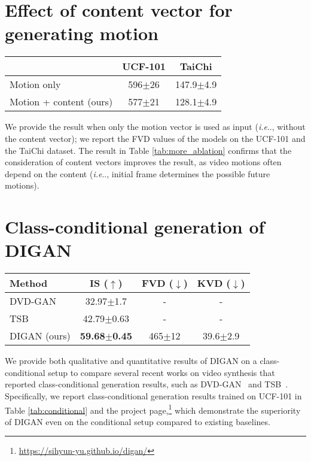\documentclass{article} \usepackage{iclr2022_conference,times}
\makeatletter
\DeclareRobustCommand\onedot{\futurelet\@let@token\@onedot}
\def\@onedot{\ifx\@let@token.\else.\null\fi\xspace}
\def\ie{\emph{i.e}\onedot} \def\Ie{\emph{I.e}\onedot}
\newcommand{\stdv}[1]{\scriptsize$\pm$#1}
\makeatother
\begin{document}
 \section{Effect of content vector for generating motion}

\begin{table*}[h]
\centering
\caption{
Effect of the motion vector $z_I$ for generating the motion. We report the mean and standard deviation of the FVD values over 10 runs.
}
\vspace{-0.1in}
\begin{tabular}{lcc}
\toprule
 & UCF-101 & TaiChi \\
\midrule
Motion only & 596\stdv{26} & 147.9\stdv{4.9}  \\
Motion + content (ours) &  577\stdv{21} & 128.1\stdv{4.9} \\
\bottomrule
\end{tabular}
\label{tab:more_ablation}
\end{table*}

We provide the result when only the motion vector is used as input (\ie, without the content vector); we report the FVD values of the models on the UCF-101 and the TaiChi dataset. The result in Table \ref{tab:more_ablation} confirms that the consideration of content vectors improves the result, as video motions often depend on the content (\ie, initial frame determines the possible future motions).
 
\clearpage
\section{Class-conditional generation of DIGAN}

\begin{table*}[h]
\centering
\caption{
IS, FVD, and KVD values of video generation models on the UCF-101 dataset. $\uparrow$ and $\downarrow$ imply higher and lower values are better, respectively.
Subscripts denote standard deviations, and bolds indicate the best results.
}
\vspace{-0.1in}
\begin{tabular}{lccc}
\toprule
Method       & IS ($\uparrow$)  & FVD ($\downarrow$) & KVD ($\downarrow$) \\
\midrule
DVD-GAN      & 32.97\stdv{1.7\phantom{0}}  & -                  & - \\
TSB          & 42.79\stdv{0.63} & -                  & - \\
DIGAN (ours) & \textbf{59.68\stdv{0.45}}  & 465\stdv{12} &  39.6\stdv{2.9}  \\
\bottomrule
\end{tabular}
\label{tab:conditional}
\end{table*}

We provide both qualitative and quantitative results of DIGAN on a class-conditional setup to compare several recent works on video synthesis that reported class-conditional generation results, such as DVD-GAN~\citep{clark2019adversarial} and TSB~\citep{munoz2021temporal}. Specifically, we report class-conditional generation results trained on UCF-101 in Table \ref{tab:conditional} and the project page,\footnote{\url{https://sihyun-yu.github.io/digan/}} which demonstrate the superiority of DIGAN even on the conditional setup compared to existing baselines.  
\end{document}
